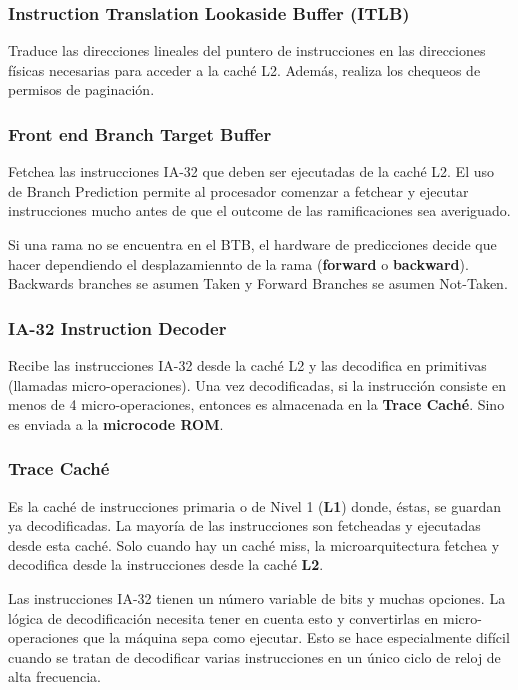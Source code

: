 \subsubsection*{Instruction Translation Lookaside Buffer (ITLB)}
Traduce las direcciones lineales del puntero de instrucciones en las direcciones físicas necesarias para acceder a la caché L2. Además, realiza los chequeos de permisos de paginación.

\subsubsection*{Front end Branch Target Buffer}
Fetchea las instrucciones IA-32 que deben ser ejecutadas de la caché L2. El uso de Branch Prediction permite al procesador comenzar a fetchear y ejecutar instrucciones mucho antes de que el outcome de las ramificaciones sea averiguado.
	
Si una rama no se encuentra en el BTB, el hardware de predicciones decide que hacer dependiendo el desplazamiennto de la rama (\textbf{forward} o \textbf{backward}). Backwards branches se asumen Taken y Forward Branches se asumen Not-Taken.
	
\subsubsection*{IA-32 Instruction Decoder}
Recibe las instrucciones IA-32 desde la caché L2 y las decodifica en primitivas (llamadas micro-operaciones). Una vez decodificadas, si la instrucción consiste en menos de 4 micro-operaciones, entonces es almacenada en la \textbf{Trace Caché}. Sino es enviada a la \textbf{microcode ROM}.

\subsubsection*{Trace Caché} 
Es la caché de instrucciones primaria o de Nivel 1 (\textbf{L1}) donde, éstas, se guardan ya decodificadas. La mayoría de las instrucciones son fetcheadas y ejecutadas desde esta caché. Solo cuando hay un caché miss, la microarquitectura fetchea y decodifica desde la instrucciones desde la caché \textbf{L2}.
	
Las instrucciones IA-32 tienen un número variable de bits y muchas opciones. La lógica de decodificación necesita tener en cuenta esto y convertirlas en micro-operaciones que la máquina sepa como ejecutar. Esto se hace especialmente difícil cuando se tratan de decodificar varias instrucciones en un único ciclo de reloj de alta frecuencia.
	
